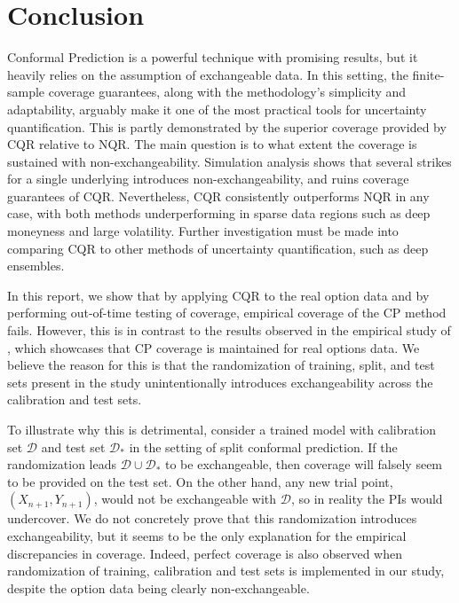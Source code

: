 \documentclass{article}
\theoremstyle{definition}
\begin{document}
\section{Conclusion}
Conformal Prediction is a powerful technique with promising results, but it heavily relies on the assumption of exchangeable data. In this setting, the finite-sample coverage guarantees, along with the methodology's simplicity and adaptability, arguably make it one of the most practical tools for uncertainty quantification. This is partly demonstrated by the superior coverage provided by CQR relative to NQR. The main question is to what extent the coverage is sustained with non-exchangeability. Simulation analysis shows that several strikes for a single underlying introduces non-exchangeability, and ruins coverage guarantees of CQR. Nevertheless, CQR consistently outperforms NQR in any case, with both methods underperforming in sparse data regions such as deep moneyness and large volatility. Further investigation must be made into comparing CQR to other methods of uncertainty quantification, such as deep ensembles. 

In this report, we show that by applying CQR to the real option data and by performing out-of-time testing of coverage, empirical coverage of the CP method fails. However, this is in contrast to the results observed in the empirical study of \cite{bastos}, which showcases that CP coverage is maintained for real options data. We believe the reason for this is that the randomization of training, split, and test sets present in the study unintentionally introduces exchangeability across the calibration and test sets. 


To illustrate why this is detrimental, consider a trained model with calibration set $\mathcal{D}$ and test set $\mathcal{D}_*$ in the setting of split conformal prediction. 
If the randomization leads $\mathcal{D} \cup \mathcal{D}_*$ to be exchangeable, then coverage will falsely seem to be provided on the test set. On the other hand, any new trial point, $(X_{n+1}, Y_{n+1})$, would not be exchangeable with $\mathcal{D}$, so in reality the PIs would undercover. We do not concretely prove that this randomization introduces exchangeability, but it seems to be the only explanation for the empirical discrepancies in coverage. Indeed, perfect coverage is also observed when randomization of training, calibration and test sets is implemented in our study, despite the option data being clearly non-exchangeable. 
\end{document}
